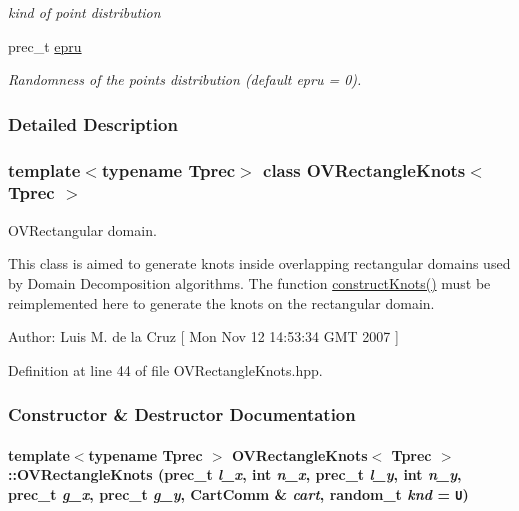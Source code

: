\begin{CompactItemize}
\begin{CompactList}\small\item\em kind of point distribution \item\end{CompactList}\item 
\hypertarget{classOVRectangleKnots_67d2d7335dbe4dd096c5ac6e73bd7052}{
prec\_\-t \hyperlink{classOVRectangleKnots_67d2d7335dbe4dd096c5ac6e73bd7052}{epru}}
\label{classOVRectangleKnots_67d2d7335dbe4dd096c5ac6e73bd7052}

\begin{CompactList}\small\item\em Randomness of the points distribution (default epru = 0). \item\end{CompactList}\end{CompactItemize}


\subsubsection{Detailed Description}
\subsubsection*{template$<$typename Tprec$>$ class OVRectangleKnots$<$ Tprec $>$}

OVRectangular domain. 

This class is aimed to generate knots inside overlapping rectangular domains used by Domain Decomposition algorithms. The function \hyperlink{classOVRectangleKnots_57cd6386ac15fafdbcd2475c44f4397a}{constructKnots()} must be reimplemented here to generate the knots on the rectangular domain. \begin{Desc}
\item[Author:]Luis M. de la Cruz \mbox{[} Mon Nov 12 14:53:34 GMT 2007 \mbox{]} \end{Desc}


Definition at line 44 of file OVRectangleKnots.hpp.

\subsubsection{Constructor \& Destructor Documentation}
\hypertarget{classOVRectangleKnots_c0e262d3c093c9b4c3fc74ff126cce99}{
\paragraph[{OVRectangleKnots}]{\setlength{\rightskip}{0pt plus 5cm}template$<$typename Tprec $>$ {\bf OVRectangleKnots}$<$ Tprec $>$::{\bf OVRectangleKnots} (prec\_\-t {\em l\_\-x}, \/  int {\em n\_\-x}, \/  prec\_\-t {\em l\_\-y}, \/  int {\em n\_\-y}, \/  prec\_\-t {\em g\_\-x}, \/  prec\_\-t {\em g\_\-y}, \/  {\bf CartComm} \& {\em cart}, \/  random\_\-t {\em knd} = {\tt U})}\hfill}
\label{classOVRectangleKnots_c0e262d3c093c9b4c3fc74ff126cce99}


